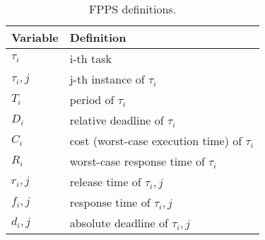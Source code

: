 \begin{table}[H]
\centering
\begin{tabular}{ll}
\textbf{Variable} & \textbf{Definition}                \\
\hline
$\tau_i$   & i-th task                                    \\
$\tau_i,j$ & j-th instance of $\tau_i$                    \\
$T_i$      & period of $\tau_i$                           \\
$D_i$      & relative deadline of $\tau_i$                \\
$C_i$      & cost (worst-case execution time) of $\tau_i$ \\
$R_i$      & worst-case response time of $\tau_i$         \\
$r_i,j$    & release time of $\tau_i,j$                   \\
$f_i,j$    & response time of $\tau_i,j$                  \\
$d_i,j$    & absolute deadline of $\tau_i,j$              \\     
\hline
\end{tabular}
\caption{FPPS definitions.}
\label{tab:FPSdef}
\end{table}
\FloatBarrier